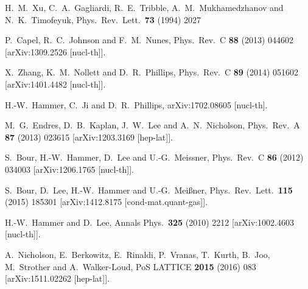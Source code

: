 \documentclass[aps,singlecolumn,superscriptaddress,nofootinbib,tightenlines,
preprintnumbers,showkeys]{revtex4-1}
\begin{document}
\begin{thebibliography}{99}
  H.~M.~Xu, C.~A.~Gagliardi, R.~E.~Tribble, A.~M.~Mukhamedzhanov
  and N.~K.~Timofeyuk,
  Phys.\ Rev.\ Lett.\ {\bf 73} (1994) 2027

  P.~Capel, R.~C.~Johnson and F.~M.~Nunes,
  Phys.\ Rev.\ C {\bf 88} (2013) 044602
  [arXiv:1309.2526 [nucl-th]].

  X.~Zhang, K.~M.~Nollett and D.~R.~Phillips,
  Phys.\ Rev.\ C {\bf 89} (2014) 051602
  [arXiv:1401.4482 [nucl-th]].

  H.-W.~Hammer, C.~Ji and D.~R.~Phillips,
  arXiv:1702.08605 [nucl-th].

  M.~G.~Endres, D.~B.~Kaplan, J.~W.~Lee and A.~N.~Nicholson,
  Phys.\ Rev.\ A {\bf 87} (2013) 023615
  [arXiv:1203.3169 [hep-lat]].

  S.~Bour, H.-W.~Hammer, D.~Lee and U.-G.~Meissner,
  Phys.\ Rev.\ C {\bf 86} (2012) 034003
  [arXiv:1206.1765 [nucl-th]].

  S.~Bour, D.~Lee, H.-W.~Hammer and U.-G.~Meißner,
  Phys.\ Rev.\ Lett.\ {\bf 115} (2015) 185301
  [arXiv:1412.8175 [cond-mat.quant-gas]].

  H.-W.~Hammer and D.~Lee,
  Annals Phys.\ {\bf 325} (2010) 2212
  [arXiv:1002.4603 [nucl-th]].

  A.~Nicholson, E.~Berkowitz, E.~Rinaldi, P.~Vranas, T.~Kurth, B.~Joo,
  M.~Strother and A.~Walker-Loud,
  PoS LATTICE {\bf 2015} (2016) 083
  [arXiv:1511.02262 [hep-lat]].


\end{thebibliography}
\end{document}
